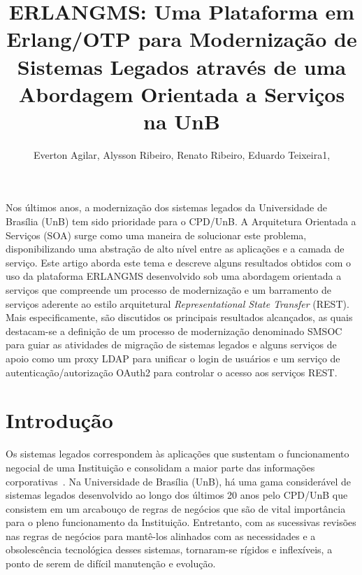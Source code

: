 \documentclass[12pt]{article}
\title{ERLANGMS: Uma Plataforma em Erlang/OTP para 
Modernização de Sistemas Legados através de uma Abordagem Orientada a Serviços na UnB}
\author{
	Everton Agilar\inst{1},
	Alysson Ribeiro\inst{1},
	Renato Ribeiro\inst{1},
	Eduardo Teixeira1\inst{1},
}
\begin{document}
 

\maketitle


     
\begin{resumo} 
Nos últimos anos, a modernização dos sistemas legados da Universidade de Brasília (UnB) tem sido 
prioridade para o CPD/UnB. 
A Arquitetura Orientada a Serviços (SOA) surge como uma maneira de solucionar 
este problema, disponibilizando uma abstração de alto nível entre as aplicações e a camada de serviço.
Este artigo aborda este tema e descreve alguns resultados obtidos com o uso 
da plataforma ERLANGMS desenvolvido sob 
uma abordagem orientada a serviços que compreende um processo 
de moderniza\c c\~{a}o e um barramento de serviços aderente ao estilo 
arquitetural \textit{Representational State Transfer} (REST). 
Mais especificamente, são discutidos os principais resultados alcançados, 
as quais destacam-se a definição de um processo de modernização denominado SMSOC 
para guiar as atividades de 
migração de sistemas legados 
e alguns serviços de apoio 
como um proxy LDAP para unificar o login de usuários e 
um serviço de autenticação/autorização OAuth2
para controlar o acesso aos serviços REST.
\end{resumo}


\section{Introdução}

Os sistemas legados correspondem às aplicações que sustentam o funcionamento 
negocial de uma Instituição e consolidam a maior parte das informações corporativas~\cite{S4_bennett1995legacy}. 
Na Universidade de Brasília (UnB), há uma gama considerável de sistemas legados desenvolvido 
ao longo dos últimos 20 anos pelo CPD/UnB que consistem em um arcabouço 
de regras de negócios que são de vital importância para o 
pleno funcionamento da Instituição. Entretanto, com as 
sucessivas revisões nas regras de negócios para mantê-los alinhados
com as necessidades e a obsolescência tecnológica desses sistemas, 
tornaram-se rígidos e inflexíveis, a ponto de serem de difícil manutenção e evolução. 
\end{document}
